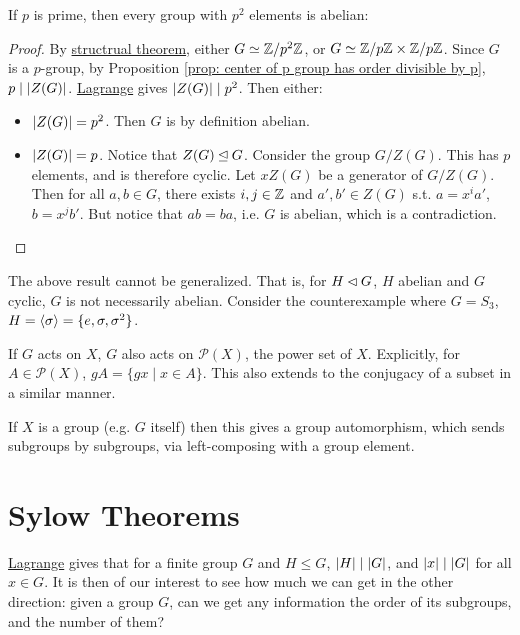 \documentclass{article}
\begin{document}
\begin{corollary}
    If $p$ is prime, then every group with $p^2$ elements is abelian:
\end{corollary}

\begin{proof}
    By \hyperref[thm: structural theorem]{structrual theorem}, either $G \simeq \mathbb{Z}/p^2\mathbb{Z}$, or $G \simeq \mathbb{Z}/p\mathbb{Z} \times \mathbb{Z}/p\mathbb{Z}$. Since $G$ is a $p$-group, by Proposition \ref{prop: center of p group has order divisible by p}, $p \mid \left|Z(G)\right|$. \hyperref[thm: Lagrange]{Lagrange} gives $\left|Z(G)\right| \mid p^2$. Then either:
    \begin{itemize}
        \item $\left|Z(G)\right| = p^2$. Then $G$ is by definition abelian.
        \item $\left|Z(G)\right| = p$. Notice that $Z(G) \unlhd G$. Consider the group $G/Z(G)$. This has $p$ elements, and is therefore cyclic. Let $x Z(G)$ be a generator of $G/Z(G)$. Then for all $a, b \in G$, there exists $i, j \in \mathbb{Z}$ and $a', b' \in Z(G)$ s.t. $a = x^i a'$, $b = x^j b'$. But notice that $ab = ba$, i.e. $G$ is abelian, which is a contradiction.
    \end{itemize}
\end{proof}

\begin{remark}
    The above result cannot be generalized. That is, for $H \lhd G$, $H$ abelian and $G$ cyclic, $G$ is not necessarily abelian. Consider the counterexample where $G = S_3$, $H = \left\langle \sigma \right\rangle = \{e, \sigma, \sigma^2\}$.
\end{remark}

\begin{remark}
    If $G$ acts on $X$, $G$ also acts on $\mathcal{P}(X)$, the power set of $X$. Explicitly, for $A \in \mathcal{P}(X)$, $gA = \{gx \mid x \in A\}$. This also extends to the conjugacy of a subset in a similar manner. 

    If $X$ is a group (e.g. $G$ itself) then this gives a group automorphism, which sends subgroups by subgroups, via left-composing with a group element. 
\end{remark}

\section{Sylow Theorems}

\textstart
\hyperref[thm: Lagrange]{Lagrange} gives that for a finite group $G$ and $H \leq G$, $\left|H\right| \mid \left|G\right|$, and $\left|x\right| \mid \left|G\right|$ for all $x \in G$. It is then of our interest to see how much we can get in the other direction: given a group $G$, can we get any information the order of its subgroups, and the number of them?
\end{document}
